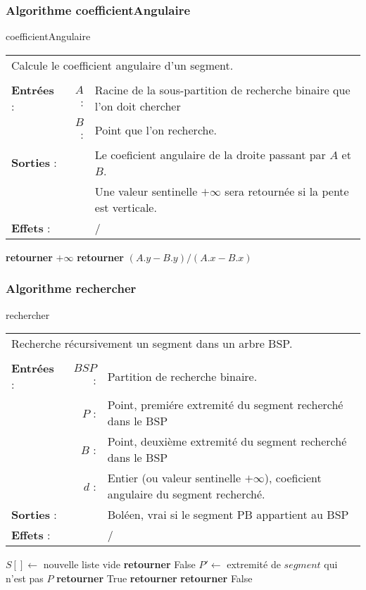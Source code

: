 \documentclass[10pt]{article}
\begin{document}
\subsubsection{Algorithme coefficientAngulaire}
\begin{algorithm}
\caption{coefficientAngulaire}
\begin{tabular}{lrl}
\multicolumn{3}{l}{Calcule le coefficient angulaire d'un segment.}\\
&&\\
\textbf{Entrées} : &$A$ : &Racine de la sous-partition de recherche binaire que l'on doit chercher\\
&$B$ :&Point que l'on recherche.\\
\textbf{Sorties} :& &Le coeficient angulaire de la droite passant par $A$ et $B$.\\
& &Une valeur sentinelle $+\infty$ sera retournée si la pente est verticale.\\
\textbf{Effets} :& &/
\end{tabular}
\begin{algorithmic}[1]
\State \textbf{retourner} $+\infty$
\Else
\State \textbf{retourner} $(A.y-B.y)/(A.x-B.x)$
\EndIf
\EndProcedure
\end{algorithmic}
\end{algorithm}

\subsubsection{Algorithme rechercher}
\begin{algorithm}[H]
\caption{rechercher}
\begin{tabular}{lrl}
\multicolumn{3}{l}{Recherche récursivement un segment dans un arbre BSP.}\\
&&\\
\textbf{Entrées} : &$BSP$ : &Partition de recherche binaire.\\
& $P$ : &Point, premiére extremité du segment recherché dans le BSP\\
& $B$ : &Point, deuxième extremité du segment recherché dans le BSP\\
& $d$ : &Entier (ou valeur sentinelle $+\infty$), coeficient angulaire du segment recherché.\\
\textbf{Sorties} :& &Boléen, vrai si le segment PB appartient au BSP\\
\textbf{Effets} :& &/
\end{tabular}
\begin{algorithmic}[1]
\State $S[ ] \gets$ nouvelle liste vide
\State {}
\State {}
\State \textbf{retourner} False
\Else 
{}
\State $P'\gets$ extremité de $segment$ qui n'est pas $P$
\State \textbf{retourner} True
\State \textbf{retourner} 
\EndIf
\EndIf
\EndFor
\EndIf
\State \textbf{retourner} False
\EndProcedure
\end{algorithmic}
\end{algorithm}
\end{document}
